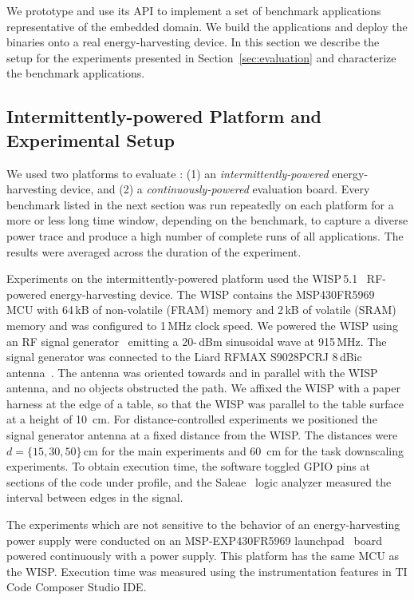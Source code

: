 We prototype \sys and use its API to implement a set of benchmark
applications representative of the embedded domain. We build the applications
and deploy the binaries onto a real energy-harvesting device. In this section
we describe the setup for the experiments presented in
Section~\ref{sec:evaluation} and characterize the benchmark applications.

\subsection{Intermittently-powered Platform and Experimental Setup}
\label{sec:results_hardware_software}

We used two platforms to evaluate \sys: (1) an \emph{intermittently-powered}
energy-harvesting device, and (2) a \emph{continuously-powered} evaluation
board.
%
Every benchmark listed in the next section was run repeatedly on
each platform for a more or less long time window, depending on the benchmark,
to capture a diverse power trace and produce a high number of complete runs of all applications.
The results were averaged across the duration of the experiment.

Experiments on the intermittently-powered platform used the
WISP\,5.1~\cite{wisp5,wisp} RF-powered energy-harvesting device.
%
The WISP contains the MSP430FR5969~\cite{wolverine} MCU with 64\,kB of
non-volatile (FRAM) memory and 2\,kB of volatile (SRAM) memory and was
configured to 1\,MHz clock speed.
%
We powered the WISP using an RF signal generator~\cite{}  emitting  a 20-\,dBm sinusoidal wave at 915\,MHz.
The signal generator was connected to the Liard RFMAX S9028PCRJ 8\,dBic
antenna~\cite{atlas2015}.
%
The antenna was oriented towards and in parallel with the WISP antenna, and
no objects obstructed the path.
%
We affixed the WISP with a paper harness at the edge of a table, so that the
WISP was parallel to the table surface at a height of 10~cm.
%
For distance-controlled experiments we positioned the signal generator
antenna at a fixed distance from the WISP. The distances were $d=\{15, 30,
50\}$\,cm for the main experiments and 60~cm for the task downscaling
experiments.
%
To obtain execution time, the software toggled GPIO pins at sections of the code
under profile, and the Saleae~\cite{saleae} logic analyzer measured
the interval between edges in the signal.

The experiments which are not sensitive to the behavior of an
energy-harvesting power supply were conducted on an MSP-EXP430FR5969
launchpad~\cite{MSP-EXP430FR5969_launchpad} board powered continuously with a
power supply.
%
This platform has the same MCU as the WISP.
%
Execution time was measured using the instrumentation features in TI Code
Composer Studio IDE.
%

